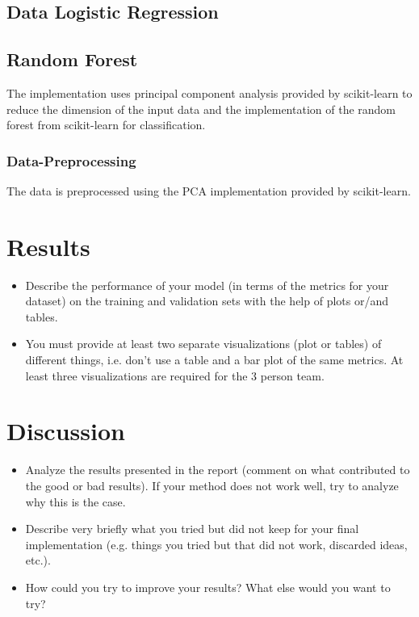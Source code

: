 \documentclass[a4, 10 pt, conference]{ieeeconf}  %
\begin{document}
\subsection{Data Logistic Regression}

\subsection{Random Forest}
The implementation uses principal component analysis provided by scikit-learn to reduce the dimension of the input data and the implementation of the random forest from scikit-learn for classification.
\subsubsection{Data-Preprocessing}
The data is preprocessed using the PCA implementation provided by scikit-learn.

\section{Results}
\label{sec:results}

{\color{blue}

\begin{itemize}
	\item Describe the performance of your model (in terms of the metrics for your dataset) on the training and validation sets with the help of plots or/and tables.
	\item You must provide at least two separate visualizations
          (plot or tables) of different things, i.e. don’t use a table
          and a bar plot of the same metrics. At least three
           visualizations are required for the 3 person team.
\end{itemize}
}

\section{Discussion}
\label{sec:discuss}

{\color{blue}
\begin{itemize}
	\item Analyze the results presented in the report (comment on what contributed to the good or bad results). If your method does not work well, try to analyze why this is the case.
	\item Describe very briefly what you tried but did not keep for your final implementation (e.g. things you tried but that did not work, discarded ideas, etc.).
	\item How could you try to improve your results? What else would you want to try?

\end{itemize}
}
\end{document}

